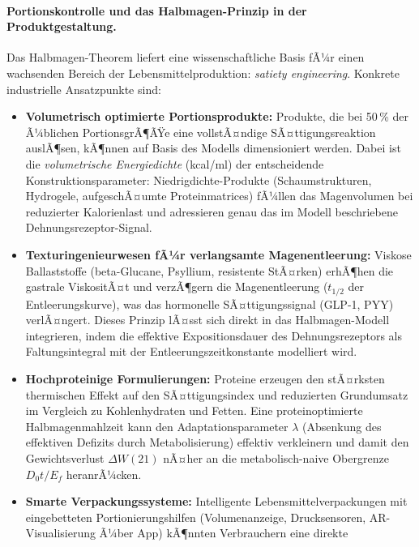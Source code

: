 ﻿\documentclass[12pt,a4paper]{article}
\theoremstyle{plain}
\theoremstyle{definition}
\theoremstyle{remark}
\begin{document}
\paragraph{Portionskontrolle und das Halbmagen-Prinzip in der Produktgestaltung.}
Das Halbmagen-Theorem liefert eine wissenschaftliche Basis fÃ¼r einen
wachsenden Bereich der Lebensmittelproduktion: \emph{satiety engineering}.
Konkrete industrielle Ansatzpunkte sind:

\begin{itemize}
  \item \textbf{Volumetrisch optimierte Portionsprodukte:}
        Produkte, die bei 50\,\% der Ã¼blichen Portions\-grÃ¶ÃŸe eine
        vollstÃ¤ndige SÃ¤ttigungsreaktion auslÃ¶sen, kÃ¶nnen auf Basis des
        Modells dimensioniert werden. Dabei ist die \emph{volumetrische
        Energiedichte} (kcal/ml) der entscheidende Konstruktionsparameter:
        Niedrigdichte-Produkte (Schaumstrukturen, Hydrogele, aufgeschÃ¤umte
        Proteinmatrices) fÃ¼llen das Magenvolumen bei reduzierter
        Kalorienlast und adressieren genau das im Modell beschriebene
        Dehnungsrezeptor-Signal.
  \item \textbf{Texturingenieurwesen fÃ¼r verlangsamte Magenentleerung:}
        Viskose Ballaststoffe (beta-Glucane, Psyllium, resistente StÃ¤rken)
        erhÃ¶hen die gastrale ViskositÃ¤t und verzÃ¶gern die Magenentleerung
        ($t_{1/2}$ der Entleerungskurve), was das hormonelle SÃ¤ttigungssignal
        (GLP-1, PYY) verlÃ¤ngert. Dieses Prinzip lÃ¤sst sich direkt in das
        Halbmagen-Modell integrieren, indem die effektive Expositionsdauer
        des Dehnungsrezeptors als Faltungsintegral mit der
        Entleerungszeitkonstante modelliert wird.
  \item \textbf{Hochproteinige Formulierungen:}
        Proteine erzeugen den stÃ¤rksten thermischen Effekt auf den
        SÃ¤ttigungsindex und reduzierten Grundumsatz im Vergleich zu
        Kohlenhydraten und Fetten. Eine proteinoptimierte Halbmagenmahlzeit
        kann den Adaptationsparameter $\lambda$ (Absenkung des effektiven
        Defizits durch Metabolisierung) effektiv verkleinern und damit
        den Gewichtsverlust $\Delta W(21)$ nÃ¤her an die metabolisch-naive
        Obergrenze $D_0 t / E_f$ heranrÃ¼cken.
  \item \textbf{Smarte Verpackungssysteme:}
        Intelligente Lebensmittelverpackungen mit eingebetteten
        Portionierungshilfen (Volumenanzeige, Drucksensoren,
        AR-Visualisierung Ã¼ber App) kÃ¶nnten Verbrauchern eine direkte

\end{itemize}
\end{document}
